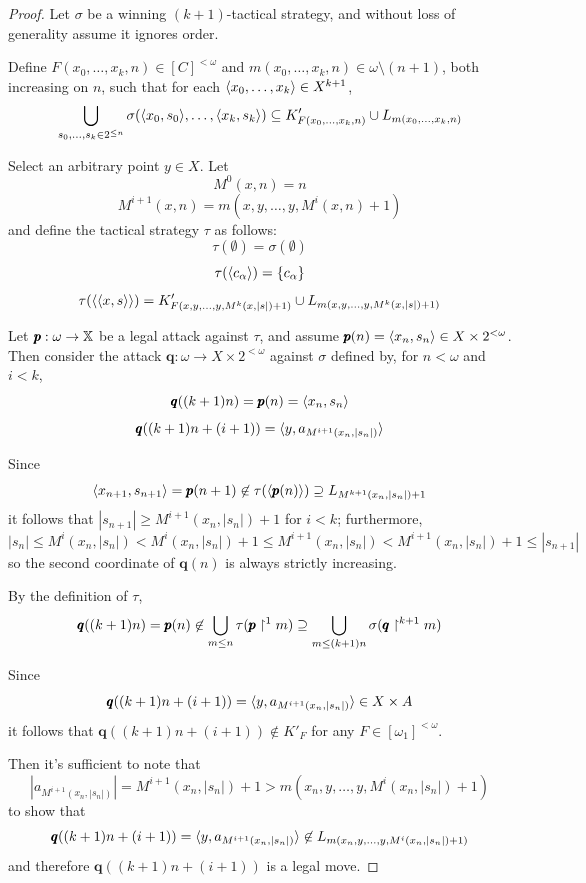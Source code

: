 \documentclass{amsart}
\theoremstyle{definition}
\begin{document}
\begin{proof}
  Let $\sigma$ be a winning $(k+1)$-tactical strategy, and without loss of
  generality assume it ignores order.

  Define $F(x_0,\dots,x_{k},n)\in [C]^{<\omega}$ and
  $m(x_0,\dots,x_{k},n)\in\omega\setminus(n+1)$, both increasing on $n$,
  such that for each $\langle x_0,\dots,x_{k}\rangle\in X^{k+1}$,
  \[
    \bigcup_{s_0,\dots,s_k \in 2^{\leq n}}
    \sigma(\langle x_0,s_0\rangle,\dots,\langle x_{k},s_{k}\rangle)
      \subseteq
    K'_{F(x_0,\dots,x_{k},n)} \cup L_{m(x_0,\dots,x_{k},n)}
  \]

  Select an arbitrary point $y \in X$.
  Let
    \[
      M^0(x,n)=n
    \]
    \[
      M^{i+1}(x,n)=m(x,y,\dots,y,M^i(x,n)+1)
    \]
  and define the tactical strategy $\tau$ as follows:
  \[
    \tau(\emptyset)
      =
    \sigma(\emptyset)
  \]
  \[
    \tau(\langle c_\alpha\rangle)
      =
    \{c_\alpha\}
  \]
  \[
    \tau(\langle\langle x,s\rangle\rangle)
      =
    K'_{F(x,y,\dots,y,M^k(x,|s|)+1)}
      \cup
    L_{m(x,y,\dots,y,M^k(x,|s|)+1)}
  \]

  Let $\pmb p:\omega\to \mathbb{X}$ be a legal attack against
  $\tau$, and assume $\pmb p(n)=\langle x_n,s_n\rangle\in X\times 2^{<\omega}$.
  Then consider the attack $\pmb q:\omega\to X\times 2^{<\omega}$ against
  $\sigma$ defined by, for $n<\omega$ and $i<k$,
    \[
      \pmb q((k+1)n)=\pmb p(n)=\langle x_n,s_n\rangle
    \]
    \[
      \pmb q((k+1)n+(i+1))=\langle y, a_{M^{i+1}(x_n,|s_n|)}\rangle
    \]

  Since
    \[
      \langle x_{n+1},s_{n+1}\rangle
        =
      \pmb p(n+1)
        \not\in
      \tau(\langle\pmb p(n)\rangle)
        \supseteq
      L_{M^{k+1}(x_n,|s_n|)+1}
    \]
  it follows that
  $|s_{n+1}|\geq M^{i+1}(x_n,|s_n|)+1$ for $i<k$; furthermore,
    \[
      |s_n|
        \leq
      M^i(x_n,|s_n|)
        <
      M^i(x_n,|s_n|)+1
        \leq
      M^{i+1}(x_n,|s_n|)
        <
      M^{i+1}(x_n,|s_n|)+1
        \leq
      |s_{n+1}|
    \]
  so the second coordinate of $\pmb q(n)$ is always strictly increasing.

  By the definition of $\tau$,
    \[
      \pmb q((k+1)n)
        =
      \pmb p(n)
        \not\in
      \bigcup_{m\leq n}
      \tau(\pmb p\restriction^1 m)
        \supseteq
      \bigcup_{m\leq (k+1)n}
      \sigma(\pmb q\restriction^{k+1} m)
    \]

  Since
    \[
      \pmb q((k+1)n+(i+1))
        =
      \langle y, a_{M^{i+1}(x_n,|s_n|)}\rangle
        \in
      X\times A
    \]
  it follows that $\pmb q((k+1)n+(i+1))\not\in K'_F$ for any
  $F\in[\omega_1]^{<\omega}$.

  Then it's sufficient to note that
    \[
      |a_{M^{i+1}(x_n,|s_n|)}|
        =
      M^{i+1}(x_n,|s_n|) + 1
        >
      m(x_n,y,\dots,y,M^i(x_n,|s_n|)+1)
    \]
  to show that
    \[
      \pmb q((k+1)n+(i+1))
        =
      \langle y, a_{M^{i+1}(x_n,|s_n|)}\rangle
        \not\in
      L_{m(x_n,y,\dots,y,M^i(x_n,|s_n|)+1)}
    \]
  and therefore $\pmb q((k+1)n+(i+1))$ is a legal move.


\end{proof}
\end{document}
